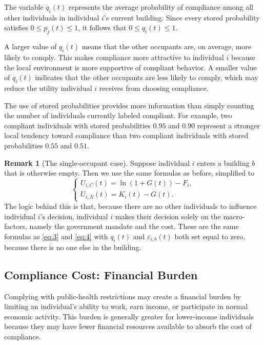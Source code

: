\documentclass[11pt]{article}
\theoremstyle{definition}
\newtheorem{remark}{Remark}[section]
\theoremstyle{plain}
\begin{document}
The variable $q_i(t)$ represents the average probability of compliance among all other individuals in individual $i$'s current building. Since every stored probability satisfies $0\leq p_j(t)\leq 1$, it follows that $0\leq q_i(t)\leq 1$.

A larger value of $q_i(t)$ means that the other occupants are, on average, more likely to comply. This makes compliance more attractive to individual $i$ because the local environment is more supportive of compliant behavior. A smaller value of $q_i(t)$ indicates that the other occupants are less likely to comply, which may reduce the utility individual $i$ receives from choosing compliance.

The use of stored probabilities provides more information than simply counting the number of individuals currently labeled compliant. For example, two compliant individuals with stored probabilities $0.95$ and $0.90$ represent a stronger local tendency toward compliance than two compliant individuals with stored probabilities $0.55$ and $0.51$.


\begin{remark}[The single-occupant case]
\label{rem:single}
Suppose individual $i$ enters a building $b$ that is otherwise empty. Then we use the same formulas as before, simplified to
\begin{equation}
\begin{cases}
U_{i,C}(t) = \ln(1+G(t)) - F_i  ,
\\
U_{i,N}(t) = K_i(t) - G(t).
\end{cases}
\end{equation}
The logic behind this is that, because there are no other individuals to influence individual $i$'s decision, individual $i$ makes their decision solely on the macro-factors, namely the government mandate and the cost.
These are the same formulas as \eqref{eq:3} and \eqref{eq:4} with $q_i(t)$ and $\varepsilon_{i,b}(t)$ both set equal to zero, because there is no one else in the building.
\end{remark}

\subsection{Compliance Cost: Financial Burden}
\label{sec:fin}

Complying with public-health restrictions may create a financial burden by limiting an individual's ability to work, earn income, or participate in normal economic activity. This burden is generally greater for lower-income individuals because they may have fewer financial resources available to absorb the cost of compliance.
\end{document}
